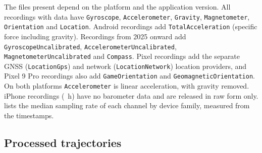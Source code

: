 The files present depend on the platform and the application version. All recordings with data have \texttt{Gyroscope}, \texttt{Accelerometer}, \texttt{Gravity}, \texttt{Magnetometer}, \texttt{Orientation} and \texttt{Location}. Android recordings add \texttt{TotalAcceleration} (specific force including gravity). Recordings from 2025 onward add \texttt{GyroscopeUncalibrated}, \texttt{AccelerometerUncalibrated}, \texttt{MagnetometerUncalibrated} and \texttt{Compass}. Pixel recordings add the separate GNSS (\texttt{LocationGps}) and network (\texttt{LocationNetwork}) location providers, and Pixel 9 Pro recordings also add \texttt{GameOrientation} and \texttt{GeomagneticOrientation}. On both platforms \texttt{Accelerometer} is linear acceleration, with gravity removed. \numNoBaroRecordings{} iPhone recordings (\numNoBaroHours~h) have no barometer data and are released in raw form only.  lists the median sampling rate of each channel by device family, measured from the timestamps.

\begin{table}[t]
\centering
\caption{Sensor channels. Rates are the median, over the recordings of each device family that enter the processed set, of each recording's median sampling rate (Hz) in the raw files; every channel is resampled to 10~Hz in the processed files. Sensor Logger requested a 10~ms interval for all inertial channels and left the barometer and location at their defaults. (a)~On iOS, where there is no \texttt{TotalAcceleration}, specific force is formed as \texttt{Accelerometer} plus \texttt{Gravity}. (b)~\texttt{Location} where \texttt{LocationGps} is absent (). Processed column names are abbreviated;  lists them in full with their units.}
\label{tab:channels}
\footnotesize
\setlength{\tabcolsep}{2.5pt}

\end{table}

\subsection{Processed trajectories}
\label{sec:processed}

